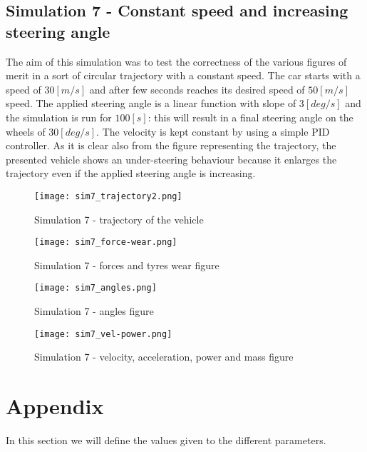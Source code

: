 \documentclass{report}
\let\Oldsection\section
\renewcommand{\section}{\FloatBarrier\Oldsection}
\let\Oldsubsection\subsection
\renewcommand{\subsection}{\FloatBarrier\Oldsubsection}
\begin{document}
\subsection{Simulation 7 - Constant speed and increasing steering angle}
The aim of this simulation was to test the correctness of the various figures of merit in a sort of circular trajectory with a constant speed. The car starts with a speed of $30[m/s]$ and after few seconds reaches its desired speed of $50[m/s]$ speed. The applied steering angle is a linear function with slope of $3[deg/s]$ and the simulation is run for $100[s]$: this will result in a final steering angle on the wheels of $30[deg/s]$. The velocity is kept constant by using a simple PID controller. As it is clear also from the figure representing the trajectory, the presented vehicle shows an under-steering behaviour because it enlarges the trajectory even if the applied steering angle is increasing. 
\begin{figure}[h!]
    \centering
    \texttt{[image: sim7\_trajectory2.png]}
    \caption{Simulation 7 - trajectory of the vehicle}
    \label{fig:sim6_1}
\end{figure}
\begin{figure}[h!]
    \centering
    \texttt{[image: sim7\_force-wear.png]}
    \caption{Simulation 7 - forces and tyres wear figure}
    \label{fig:sim6_2}
\end{figure}
\begin{figure}[h!]
    \centering
    \texttt{[image: sim7\_angles.png]}
    \caption{Simulation 7 - angles figure}
    \label{fig:sim6_2}
\end{figure}
\begin{figure}[h!]
    \centering
    \texttt{[image: sim7\_vel-power.png]}
    \caption{Simulation 7 - velocity, acceleration, power and mass figure}
    \label{fig:sim6_3}
\end{figure}

\clearpage
\newpage

\section{Appendix}

In this section we will define the values given to the different parameters. 
\end{document}
